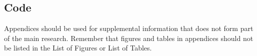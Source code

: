 \documentclass{sfuthesis}
\begin{document}
\backmatter%
	
	

\begin{appendices} %
\chapter{Code}

Appendices should be used for supplemental information that does not form part of the main research. Remember that figures and tables in appendices should not be listed in the List of Figures or List of Tables. 
	
\end{appendices}
\end{document}
